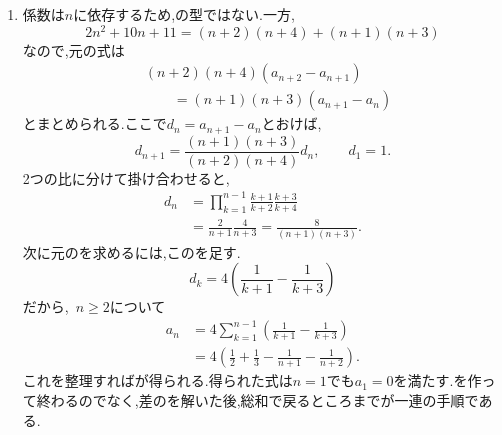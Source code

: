 \begin{enumerate}[label=\textbf{問\arabic*.},leftmargin=3.8em,format=\bookitemlink{practice-advanced}{solution}{problem}]
                \noindent \textbf{【別解】}\\
                $c_n$の式から$\displaystyle u_n=\frac{1}{c_n-1}$とおいてもよい.
                \[
                 u_{n+1}=\frac{n+2}{n}u_n+\frac1n.
                \]
                定数$\displaystyle \frac{1}{2}$を加えると,
                \[
                 u_{n+1}+\frac12
                   =\frac{n+2}{n}\left(u_n+\frac12\right).
                \]
                $\displaystyle u_1=\frac{1}{2}$から,\, $\displaystyle u_n+\frac{1}{2}=\frac{n(n+1)}{2}$を得る.二基準点の比を取る方法と,一基準点との差の逆数を取ってから定数を加える方法が対応している.
          \item 係数は$n$に依存するため,の型ではない.一方,
                \[
                  2n^2+10n+11
                   =(n+2)(n+4)+(n+1)(n+3)
                \]
                なので,元の式は
                \begin{align*}
                 &(n+2)(n+4)(a_{n+2}-a_{n+1})\\
                 &\qquad=(n+1)(n+3)(a_{n+1}-a_n)
                \end{align*}
                とまとめられる.ここで$d_n=a_{n+1}-a_n$とおけば,
                \[
                  d_{n+1}
                   =\frac{(n+1)(n+3)}{(n+2)(n+4)}d_n,
                  \qquad d_1=1.
                \]
                2つの比に分けて掛け合わせると,
                \begin{align*}
                 d_n
                  &=\prod_{k=1}^{n-1}
                      \frac{k+1}{k+2}\frac{k+3}{k+4}\\
                  &=\frac2{n+1}\frac4{n+3}
                   =\frac8{(n+1)(n+3)}.
                \end{align*}
                次に元のを求めるには,このを足す.
                \[
                 d_k=4\left(\frac1{k+1}-\frac1{k+3}\right)
                \]
                だから,\, $n\ge2$について
                \begin{align*}
                 a_n
                  &=4\sum_{k=1}^{n-1}
                       \left(\frac1{k+1}-\frac1{k+3}\right)\\
                  &=4\left(\frac12+\frac13
                          -\frac1{n+1}-\frac1{n+2}\right).
                \end{align*}
                これを整理すればが得られる.得られた式は$n=1$でも$a_1=0$を満たす.を作って終わるのでなく,差のを解いた後,総和で戻るところまでが一連の手順である.


\end{enumerate}
